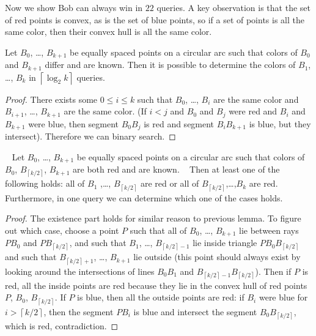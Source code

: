 \documentclass[11pt]{scrartcl}
\begin{document}
Now we show Bob can always win in $22$ queries.
A key observation is that the set of red points is convex,
as is the set of blue points, so if a set of points is all the same color,
then their convex hull is all the same color.
\begin{lemma*}
  Let $B_0$, \dots, $B_{k+1}$ be equally spaced points on a circular arc
  such that colors of $B_0$ and $B_{k+1}$ differ and are known.
  Then it is possible to determine the colors of $B_1$, \dots, $B_k$
	in $\left\lceil \log_2k \right\rceil$ queries.
\end{lemma*}
\begin{proof}
  There exists some $0\le i\le k$ such that $B_0$, \dots, $B_{i}$
  are the same color and $B_{i+1}$, \dots, $B_{k+1}$ are the same color.
  (If $i<j$ and $B_0$ and $B_j$ were red and $B_i$ and $B_{k+1}$ were blue,
  then segment $B_0B_j$ is red and segment $B_iB_{k+1}$ is blue,
  but they intersect).
  Therefore we can binary search.
\end{proof}
\begin{lemma*}
  Let $B_0$, \dots, $B_{k+1}$ be equally spaced points on a circular arc
  such that colors of $B_0$, $B_{\left\lceil k/2 \right\rceil}$, $B_{k+1}$
  are both red and are known.
  Then at least one of the following holds:
  all of $B_1$ ,\dots, $B_{\left\lceil k/2 \right\rceil}$ are red
  or all of $B_{\left\lceil k/2 \right\rceil}$,\dots,$B_k$ are red.
  Furthermore, in one query we can determine which one of the cases holds.
\end{lemma*}
\begin{proof}
  The existence part holds for similar reason to previous lemma.
  To figure out which case, choose a point $P$ such that
  all of $B_0$, \dots, $B_{k+1}$
  lie between rays $PB_0$ and $PB_{\left\lceil k/2 \right\rceil}$,
  and such that $B_1$, \dots, $B_{\left\lceil k/2 \right\rceil-1}$ lie inside
  triangle $PB_0B_{\left\lceil k/2 \right\rceil}$ and such that
  $B_{\left\lceil k/2 \right\rceil+1}$, \dots, $B_{k+1}$ lie outside
  (this point should always exist by looking around the intersections of lines $B_0B_1$ and
  $B_{\left\lceil k/2 \right\rceil-1}B_{\left\lceil k/2 \right\rceil}$).
  Then if $P$ is red, all the inside points are red
	because they lie in the convex hull of red points $P$, $B_0$, $B_{\left\lceil k/2 \right\rceil}$.
  If $P$ is blue, then all the outside points are red:
  if $B_i$ were blue for $i > \left\lceil k/2 \right\rceil$,
  then the segment $PB_i$ is blue and intersect the segment
  $B_0B_{\left\lceil k/2 \right\rceil}$, which is red, contradiction.
\end{proof}
\end{document}
